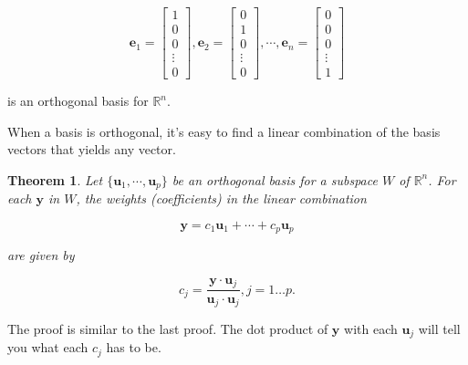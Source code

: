 \documentclass[
]{book}
\newtheorem{theorem}{Theorem}[chapter]
\theoremstyle{definition}
\theoremstyle{definition}
\theoremstyle{definition}
\theoremstyle{definition}
\theoremstyle{remark}
\begin{document}
\[\mathbf{e}_1=\begin{bmatrix}1\\0\\0\\\vdots\\0\end{bmatrix},\mathbf{e}_2=\begin{bmatrix}0 \\1\\0\\\vdots\\0\end{bmatrix},\cdots,\mathbf{e}_n=\begin{bmatrix}0\\0\\0\\\vdots\\1\end{bmatrix}\]

is an orthogonal basis for \(\mathbb{R}^n\).

When a basis is orthogonal, it's easy to find a linear combination of the basis vectors that yields any vector.

\begin{theorembox}

\begin{theorem}
\protect\hypertarget{thm:orthobasis}{}\label{thm:orthobasis}Let \(\{\mathbf{u}_1,\cdots,\mathbf{u}_p\}\) be an orthogonal basis for a subspace \(W\) of \(\mathbb{R}^n\). For each \(\mathbf{y}\) in \(W\), the weights (coefficients) in the linear combination

\[\mathbf{y}=c_1\mathbf{u}_1+\cdots+c_p\mathbf{u}_p\]

are given by

\[c_j=\frac{\mathbf{y}\cdot \mathbf{u}_j}{\mathbf{u}_j\cdot \mathbf{u}_j},j=1\dots p.\]
\end{theorem}

\end{theorembox}

The proof is similar to the last proof. The dot product of \(\mathbf{y}\) with each \(\mathbf{u}_j\) will tell you what each \(c_j\) has to be.
\end{document}
